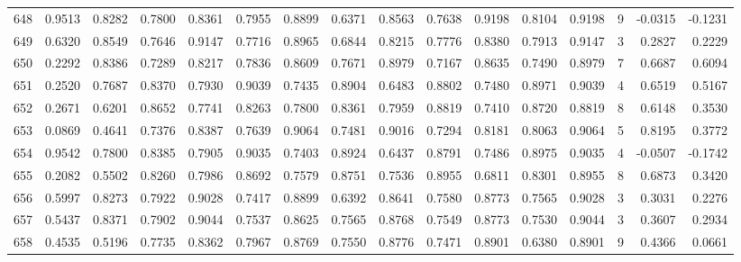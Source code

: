 \begin{tabular}{lrrrrrrrrrrrrrrr}
648 &      0.9513 &  0.8282 &  0.7800 &  0.8361 &  0.7955 &  0.8899 &  0.6371 &  0.8563 &  0.7638 &  0.9198 &   0.8104 &     0.9198 &      9 &                   -0.0315 &                    -0.1231 \\
649 &      0.6320 &  0.8549 &  0.7646 &  0.9147 &  0.7716 &  0.8965 &  0.6844 &  0.8215 &  0.7776 &  0.8380 &   0.7913 &     0.9147 &      3 &                    0.2827 &                     0.2229 \\
650 &      0.2292 &  0.8386 &  0.7289 &  0.8217 &  0.7836 &  0.8609 &  0.7671 &  0.8979 &  0.7167 &  0.8635 &   0.7490 &     0.8979 &      7 &                    0.6687 &                     0.6094 \\
651 &      0.2520 &  0.7687 &  0.8370 &  0.7930 &  0.9039 &  0.7435 &  0.8904 &  0.6483 &  0.8802 &  0.7480 &   0.8971 &     0.9039 &      4 &                    0.6519 &                     0.5167 \\
652 &      0.2671 &  0.6201 &  0.8652 &  0.7741 &  0.8263 &  0.7800 &  0.8361 &  0.7959 &  0.8819 &  0.7410 &   0.8720 &     0.8819 &      8 &                    0.6148 &                     0.3530 \\
653 &      0.0869 &  0.4641 &  0.7376 &  0.8387 &  0.7639 &  0.9064 &  0.7481 &  0.9016 &  0.7294 &  0.8181 &   0.8063 &     0.9064 &      5 &                    0.8195 &                     0.3772 \\
654 &      0.9542 &  0.7800 &  0.8385 &  0.7905 &  0.9035 &  0.7403 &  0.8924 &  0.6437 &  0.8791 &  0.7486 &   0.8975 &     0.9035 &      4 &                   -0.0507 &                    -0.1742 \\
655 &      0.2082 &  0.5502 &  0.8260 &  0.7986 &  0.8692 &  0.7579 &  0.8751 &  0.7536 &  0.8955 &  0.6811 &   0.8301 &     0.8955 &      8 &                    0.6873 &                     0.3420 \\
656 &      0.5997 &  0.8273 &  0.7922 &  0.9028 &  0.7417 &  0.8899 &  0.6392 &  0.8641 &  0.7580 &  0.8773 &   0.7565 &     0.9028 &      3 &                    0.3031 &                     0.2276 \\
657 &      0.5437 &  0.8371 &  0.7902 &  0.9044 &  0.7537 &  0.8625 &  0.7565 &  0.8768 &  0.7549 &  0.8773 &   0.7530 &     0.9044 &      3 &                    0.3607 &                     0.2934 \\
658 &      0.4535 &  0.5196 &  0.7735 &  0.8362 &  0.7967 &  0.8769 &  0.7550 &  0.8776 &  0.7471 &  0.8901 &   0.6380 &     0.8901 &      9 &                    0.4366 &                     0.0661 \\

\end{tabular}
